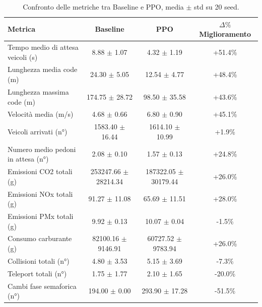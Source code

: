 \begin{table}[ht]
\centering
\caption{Confronto delle metriche tra Baseline e PPO, media $\pm$ std su 20 seed.}
\label{tab:final_comparison}
\begin{tabular}{lccc}
\toprule
\textbf{Metrica} & \textbf{Baseline} & \textbf{PPO} & \textbf{$\Delta\%$ Miglioramento} \\
\midrule
Tempo medio di attesa veicoli (s) & 8.88 $\pm$ 1.07 & 4.32 $\pm$ 1.19 & +51.4\% \\
Lunghezza media code (m) & 24.30 $\pm$ 5.05 & 12.54 $\pm$ 4.77 & +48.4\% \\
Lunghezza massima code (m) & 174.75 $\pm$ 28.72 & 98.50 $\pm$ 35.58 & +43.6\% \\
Velocità media (m/s) & 4.68 $\pm$ 0.66 & 6.80 $\pm$ 0.90 & +45.1\% \\
Veicoli arrivati (n°) & 1583.40 $\pm$ 16.44 & 1614.10 $\pm$ 10.99 & +1.9\% \\
Numero medio pedoni in attesa (n°) & 2.08 $\pm$ 0.10 & 1.57 $\pm$ 0.13 & +24.8\% \\
Emissioni CO2 totali (g) & 253247.66 $\pm$ 28214.34 & 187322.05 $\pm$ 30179.44 & +26.0\% \\
Emissioni NOx totali (g) & 91.27 $\pm$ 11.08 & 65.69 $\pm$ 11.51 & +28.0\% \\
Emissioni PMx totali (g) & 9.92 $\pm$ 0.13 & 10.07 $\pm$ 0.04 & -1.5\% \\
Consumo carburante (g) & 82100.16 $\pm$ 9146.91 & 60727.52 $\pm$ 9783.94 & +26.0\% \\
Collisioni totali (n°) & 4.80 $\pm$ 3.53 & 5.15 $\pm$ 3.69 & -7.3\% \\
Teleport totali (n°) & 1.75 $\pm$ 1.77 & 2.10 $\pm$ 1.65 & -20.0\% \\
Cambi fase semaforica (n°) & 194.00 $\pm$ 0.00 & 293.90 $\pm$ 17.28 & -51.5\% \\
\bottomrule
\end{tabular}
\end{table}